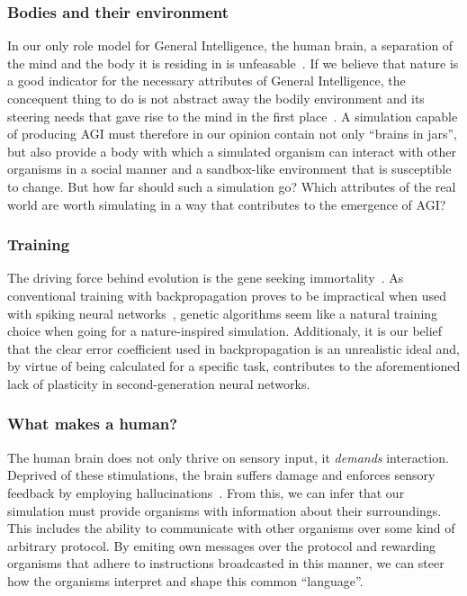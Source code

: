 \subsubsection{Bodies and their environment}
In our only role model for General Intelligence, the human brain, a separation of the mind and
the body it is residing in is unfeasable~\cite{Dudai2014}. If we believe that nature is a good 
indicator for the necessary attributes of General Intelligence, the concequent thing to do is not 
abstract away the bodily environment and its steering needs that gave rise to the mind in the first place~\cite{Jekely2010}. 
A simulation capable of producing AGI must therefore in our opinion contain not only ``brains in jars'', but 
also provide a body with which a simulated organism can interact with other organisms in a social manner and a 
sandbox-like environment that is susceptible to change.
But how far should such a simulation go? Which attributes of the real world are worth simulating in a way 
that contributes to the emergence of AGI\@?

\subsubsection{Training}
The driving force behind evolution is the gene seeking immortality~\cite{Dawkins1976}.
As conventional training with backpropagation proves to be impractical when used with
spiking neural networks~\cite{Paugam-Moisy2012}, genetic algorithms seem like a natural training choice
when going for a nature-inspired simulation. Additionaly, it is our belief that the clear error
coefficient used in backpropagation is an unrealistic ideal and, by virtue of being calculated for
a specific task, contributes to the aforementioned lack of plasticity in second-generation neural networks.


\subsubsection{What makes a human?}
The human brain does not only thrive on sensory input, it
\emph{demands} interaction. Deprived of these stimulations,
the brain suffers damage and enforces sensory feedback by employing
hallucinations~\cite{Grassian2006}. From this, we can infer that
our simulation must provide organisms with information about their surroundings.
This includes the ability to communicate with other organisms over some
kind of arbitrary protocol. By emiting own messages over the protocol and 
rewarding organisms that adhere to instructions broadcasted in this manner,
we can steer how the organisms interpret and shape this common ``language''.
